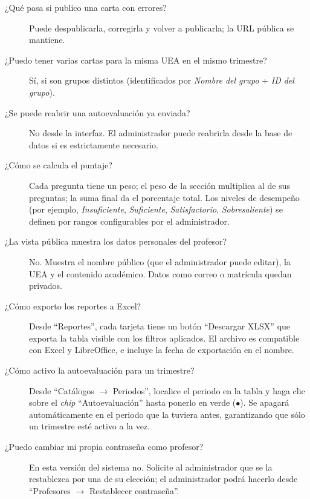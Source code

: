 \documentclass{computacion}
\begin{document}
\begin{description}
    \item[¿Qué pasa si publico una carta con errores?] Puede despublicarla, corregirla y volver a publicarla; la URL pública se mantiene.
    \item[¿Puedo tener varias cartas para la misma UEA en el mismo trimestre?] Sí, si son grupos distintos (identificados por \emph{Nombre del grupo} + \emph{ID del grupo}).
    \item[¿Se puede reabrir una autoevaluación ya enviada?] No desde la interfaz. El administrador puede reabrirla desde la base de datos si es estrictamente necesario.
    \item[¿Cómo se calcula el puntaje?] Cada pregunta tiene un peso; el peso de la sección multiplica al de sus preguntas; la suma final da el porcentaje total. Los niveles de desempeño (por ejemplo, \emph{Insuficiente}, \emph{Suficiente}, \emph{Satisfactorio}, \emph{Sobresaliente}) se definen por rangos configurables por el administrador.
    \item[¿La vista pública muestra los datos personales del profesor?] No. Muestra el nombre público (que el administrador puede editar), la UEA y el contenido académico. Datos como correo o matrícula quedan privados.
    \item[¿Cómo exporto los reportes a Excel?] Desde ``Reportes'', cada tarjeta tiene un botón ``Descargar XLSX'' que exporta la tabla visible con los filtros aplicados. El archivo es compatible con Excel y LibreOffice, e incluye la fecha de exportación en el nombre.
    \item[¿Cómo activo la autoevaluación para un trimestre?] Desde ``Catálogos $\to$ Periodos'', localice el periodo en la tabla y haga clic sobre el \emph{chip} ``Autoevaluación'' hasta ponerlo en verde ($\bullet$). Se apagará automáticamente en el periodo que la tuviera antes, garantizando que sólo un trimestre esté activo a la vez.
    \item[¿Puedo cambiar mi propia contraseña como profesor?] En esta versión del sistema no. Solicite al administrador que se la restablezca por una de su elección; el administrador podrá hacerlo desde ``Profesores $\to$ Restablecer contraseña''.
\end{description}
\end{document}

